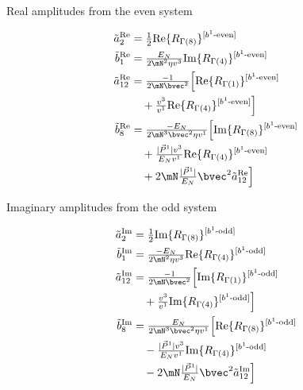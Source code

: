 \begin{frame}{Real amplitudes from the even system}
  \normalsize

      \begin{align*}
        \aR2&=\tfrac12\Rr{Re}{8}{b^1\text{-even}}\\
        \bR1&=\tfrac{\En}{2\mN^2\eta v^3}\Rr{Im}{4}{b^1\text{-even}}\\
        \aR{12}&=\tfrac{-1}{2\mN\bvec^2}\Big[\Rr{Re}{1}{b^1\text{-even}}\\&\quad+\tfrac{v^3}{v^1}\Rr{Re}{4}{b^1\text{-even}}\Big]\\
        \bR8&=\tfrac{-\En}{2\mN^3\bvec^2\eta v^1}\Big[\Rr{Im}{8}{b^1\text{-even}}\\&\quad+\tfrac{\Pa v^3}{\En v^1}\Rr{Re}{4}{b^1\text{-even}}\\&\quad+2\mN\tfrac{\Pa}{\En}\bvec^2\aR{12}\Big]
      \end{align*}
\end{frame}

\begin{frame}{Imaginary amplitudes from the odd system}
  \normalsize

      \begin{align*}
        \aI2&=\tfrac12\Rr{Im}{8}{b^1\text{-odd}}\\
        \bI1&=\tfrac{-\En}{2\mN^2\eta v^3}\Rr{Re}{4}{b^1\text{-odd}}\\
        \aI{12}&=\tfrac{-1}{2\mN\bvec^2}\Big[\Rr{Im}{1}{b^1\text{-odd}}\\&\quad+\tfrac{v^3}{v^1}\Rr{Im}{4}{b^1\text{-odd}}\Big]\\
        \bI8&=\tfrac{\En}{2\mN^3\bvec^2\eta v^1}\Big[\Rr{Re}{8}{b^1\text{-odd}}\\&\quad-\tfrac{\Pa v^3}{\En v^1}\Rr{Im}{4}{b^1\text{-odd}}\\&\quad-2\mN\tfrac{\Pa}{\En}\bvec^2\aI{12}\Big]
      \end{align*}
\end{frame}

